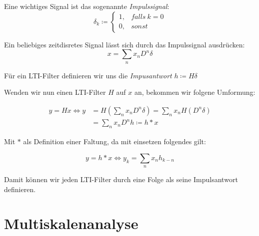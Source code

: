 \documentclass[]{scrartcl}
\theoremstyle{plain}
\newtheorem{lem}[theo]{Lemma}
\newtheorem{defn}[theo]{Definition}
\theoremstyle{remark}
\begin{document}
    Eine wichtiges Signal ist das sogenannte \emph{Impulssignal}:
    $$\delta_k \coloneqq
    \begin{cases}
        1, &falls \: k=0\\
        0, &sonst    
    \end{cases} 
    $$

    Ein beliebiges zeitdisretes Signal lässt sich durch das Impulssignal ausdrücken:
    $$x = \sum_n x_n D^n \delta$$

    Für ein LTI-Filter definieren wir uns die \emph{Impusantwort} $h \coloneqq H\delta$

    Wenden wir nun einen LTI-Filter $H$ auf $x$ an, bekommen wir folgene Umformung:

    \begin{align*}
        y = Hx \Leftrightarrow y &= H(\sum_n x_n D^n \delta) = \sum_n x_n H (D^n \delta) \\
            &= \sum_n x_n D^n h \coloneqq h * x
    \end{align*}

    Mit $*$ als Definition einer Faltung, da mit einsetzen folgendes gilt:

    $$y = h*x \Leftrightarrow y_k = \sum_n x_n h_{k-n}$$

    Damit können wir jeden LTI-Filter durch eine Folge als seine Impulsantwort definieren.







    \section{Multiskalenanalyse}
\end{document}
